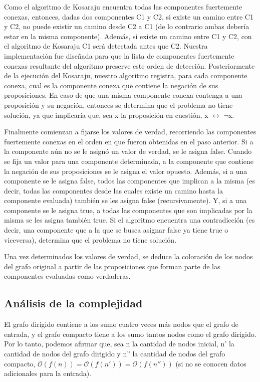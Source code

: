 Como el algoritmo de Kosaraju encuentra todas las componentes fuertemente conexas, entonces, dadas dos componentes C1 y C2, si existe un camino entre C1 y C2, no puede existir un camino desde C2 a C1 (de lo contrario ambas debería estar en la misma componente). Además, si existe un camino entre C1 y C2, con el algoritmo de Kosaraju C1 será detectada antes que C2. Nuestra implementación fue diseñada para que la lista de componentes fuertemente conexas resultante del algoritmo preserve este orden de detección. Posteriormente de la ejecución del Kosaraju, nuestro algoritmo registra, para cada componente conexa, cual es la componente conexa que contiene la negación de sus proposiciones. En caso de que una misma componente conexa contenga a una proposición y su negación, entonces se determina que el problema no tiene solución, ya que implicaría que, sea x la proposición en cuestión, x $\leftrightarrow$ $\lnot$x.

Finalmente comienzan a fijarse los valores de verdad, recorriendo las componentes fuertemente conexas en el orden en que fueron obtenidas en el paso anterior. Si a la componente aún no se le asignó un valor de verdad, se le asigna false. Cuando se fija un valor para una componente determinada, a la componente que contiene la negación de sus proposiciones se le asigna el valor opuesto.  Además, si a una componente se le asigna false, todos las componentes que implican a la misma (es decir, todas las componentes desde las cuales existe un camino hasta la componente evaluada) también se les asigna false (recursivamente). Y, si a una componente se le asigna true, a todas las componentes que son implicadas por la misma se  les asigna también true. Si el algoritmo encuentra una contradicción (es decir, una componente que a la que se busca  asignar false ya tiene true o viceversa), determina que el problema no tiene solución.

Una vez determinados los valores de verdad, se deduce la coloración de los nodos del grafo original a partir de las proposiciones que forman parte de las componentes evaluadas como verdaderas.


\subsection{Análisis de la complejidad}
El grafo dirigido contiene a los sumo cuatro veces más nodos que el grafo de entrada, y el grafo compacto tiene a los sumo tantos nodos como el grafo dirigido. Por lo tanto, podemos afirmar que, sea n la cantidad de nodos inicial, n' la cantidad de nodos del grafo dirigido y n'' la cantidad de nodos del grafo compacto, $\mathcal{O}(f(n)) = \mathcal{O}(f(n')) = \mathcal{O}(f(n''))$ (si no se conocen datos adicionales para la entrada).

